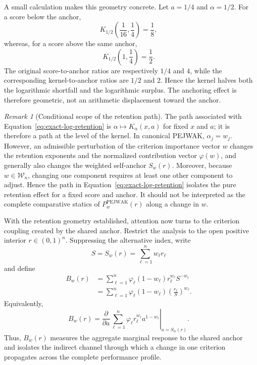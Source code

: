 \documentclass[reqno,11pt]{amsart}
\theoremstyle{definition}
\theoremstyle{plain}
\theoremstyle{remark}
\newtheorem{remark}{Remark}
\begin{document}
A small calculation makes this geometry concrete. Let $a=1/4$ and
$\alpha=1/2$. For a score below the anchor,
\[
K_{1/2}\left(\frac{1}{16},\frac{1}{4}\right)
=
\frac{1}{8},
\]
whereas, for a score above the same anchor,
\[
K_{1/2}\left(1,\frac{1}{4}\right)
=
\frac{1}{2}.
\]
The original score-to-anchor ratios are respectively $1/4$ and $4$,
while the corresponding kernel-to-anchor ratios are $1/2$ and $2$.
Hence the kernel halves both the logarithmic shortfall and the
logarithmic surplus. The anchoring effect is therefore geometric, not
an arithmetic displacement toward the anchor.

\begin{remark}[Conditional scope of the retention path]
The path associated with
Equation~\eqref{eq:exact-log-retention} is
$\alpha\mapsto K_\alpha(x,a)$ for fixed $x$ and $a$; it is therefore
a path at the level of the kernel. In canonical PEJWAK,
$\alpha_j=w_j$. However, an admissible perturbation of the criterion
importance vector $w$ changes the retention exponents and the normalized
contribution vector $\varphi(w)$, and generally also changes the weighted
self-anchor $S_w(r)$. Moreover, because $w\in\mathcal W_n$, changing one
component requires at least one other component to adjust. Hence the path
in Equation~\eqref{eq:exact-log-retention} isolates the pure retention
effect for a fixed score and anchor. It should not be interpreted as the
complete comparative statics of
$P_w^{\mathrm{PEJWAK}}(r)$ along a change in $w$.
\end{remark}

With the retention geometry established, attention now turns to the
criterion coupling created by the shared anchor. Restrict the analysis
to the open positive interior $r\in(0,1)^n$. Suppressing the alternative
index, write
\[
S=S_w(r)=\sum_{\ell=1}^{n}w_\ell r_\ell
\]
and define
\begin{equation}
\begin{aligned}
B_w(r)
&=
\sum_{\ell=1}^{n}
\varphi_\ell(1-w_\ell)
r_\ell^{w_\ell}S^{-w_\ell}\\
&=
\sum_{\ell=1}^{n}
\varphi_\ell(1-w_\ell)
\left(\frac{r_\ell}{S}\right)^{w_\ell}.
\end{aligned}
\label{eq:profile-coupling-B}
\end{equation}
Equivalently,
\[
B_w(r)
=
\left.
\frac{\partial}{\partial a}
\sum_{\ell=1}^{n}
\varphi_\ell r_\ell^{w_\ell}a^{1-w_\ell}
\right|_{a=S_w(r)}.
\]
Thus, $B_w(r)$ measures the aggregate marginal response to the shared
anchor and isolates the indirect channel through which a change in one
criterion propagates across the complete performance profile.
\end{document}
